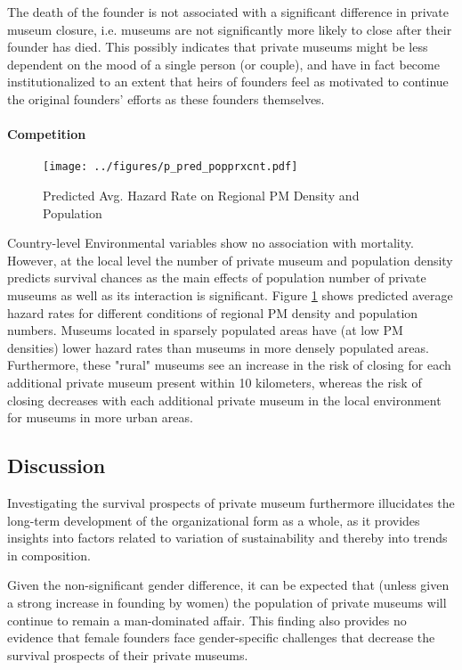 \documentclass[12pt]{article}
\begin{document}
The death of the founder is not associated with a significant difference in private museum closure, i.e. museums are not significantly more likely to close after their founder has died.
This possibly indicates that private museums might be less dependent on the mood of a single person (or couple), and have in fact become institutionalized to an extent that heirs of founders feel as motivated to continue the original founders' efforts as these founders themselves.

\paragraph*{Competition}

\begin{figure}[htbp]
\centering
\texttt{[image: ../figures/p\_pred\_popprxcnt.pdf]}
\caption{\label{fig:p_pred_popprxcnt}Predicted Avg. Hazard Rate on Regional PM Density and Population}
\end{figure}



Country-level Environmental variables show no association with mortality.
However, at the local level the number of private museum and population density predicts survival chances as the main effects of population number of private museums as well as its interaction is significant.
Figure \ref{fig:p_pred_popprxcnt} shows predicted average hazard rates for different conditions of regional PM density and population numbers.
Museums located in sparsely populated areas have (at low PM densities) lower hazard rates than museums in more densely populated areas. 
Furthermore, these "rural" museums see an increase in the risk of closing for each additional private museum present within 10 kilometers, whereas the risk of closing decreases with  each additional private museum in the local environment for museums in more urban areas. 


\subsection*{Discussion}



Investigating the survival prospects of private museum furthermore illucidates the long-term development of the organizational form as a whole, as it provides insights into factors related to variation of sustainability and thereby into trends in composition. 



Given the non-significant gender difference, it can be expected that (unless given a strong increase in founding by women) the population of private museums will continue to remain a man-dominated affair.
This finding also provides no evidence that female founders face gender-specific challenges that decrease the survival prospects of their private museums. 
\end{document}
